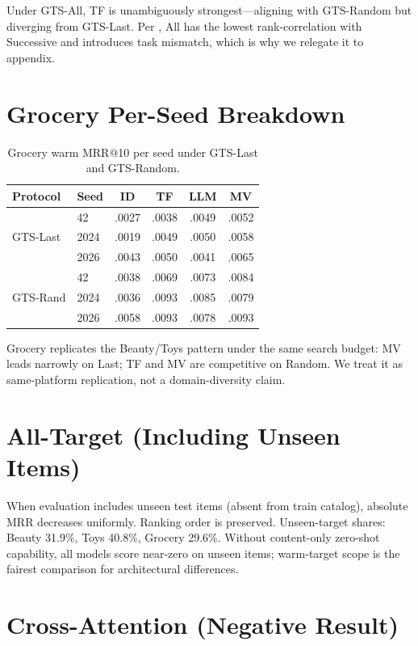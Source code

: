 \documentclass[sigconf,natbib=true,anonymous]{acmart}
\begin{document}
Under GTS-All, TF is unambiguously strongest---aligning with GTS-Random but diverging from GTS-Last.
Per \citet{liang2024timetosplit}, All has the lowest rank-correlation with Successive and introduces task mismatch, which is why we relegate it to appendix.

\section{Grocery Per-Seed Breakdown}
\label{app:grocery}

\begin{table}[h]
\centering
\caption{Grocery warm MRR@10 per seed under GTS-Last and GTS-Random.}
\label{tab:grocery-perseed}
\small
\setlength{\tabcolsep}{3pt}
\begin{tabular}{@{}llcccc@{}}
\toprule
Protocol & Seed & ID & TF & LLM & MV \\
\midrule
\multirow{3}{*}{GTS-Last}
 & 42    & .0027 & .0038 & .0049 & .0052 \\
 & 2024  & .0019 & .0049 & .0050 & .0058 \\
 & 2026  & .0043 & .0050 & .0041 & .0065 \\
\midrule
\multirow{3}{*}{GTS-Rand}
 & 42    & .0038 & .0069 & .0073 & .0084 \\
 & 2024  & .0036 & .0093 & .0085 & .0079 \\
 & 2026  & .0058 & .0093 & .0078 & .0093 \\
\bottomrule
\end{tabular}
\end{table}

Grocery replicates the Beauty/Toys pattern under the same search budget: MV leads narrowly on Last; TF and MV are competitive on Random.
We treat it as same-platform replication, not a domain-diversity claim.

\section{All-Target (Including Unseen Items)}
\label{app:alltarget}

When evaluation includes unseen test items (absent from train catalog), absolute MRR decreases uniformly.
Ranking order is preserved.
Unseen-target shares: Beauty 31.9\%, Toys 40.8\%, Grocery 29.6\%.
Without content-only zero-shot capability, all models score near-zero on unseen items; warm-target scope is the fairest comparison for architectural differences.

\section{Cross-Attention (Negative Result)}
\label{app:cross}
\end{document}
